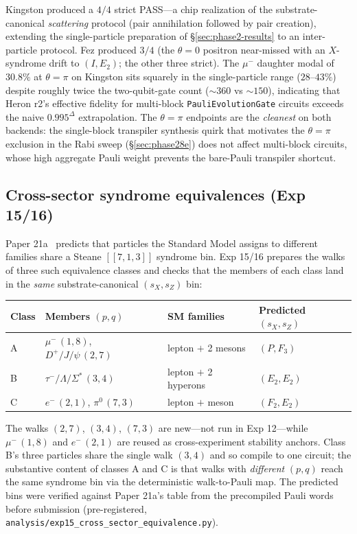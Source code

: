 \documentclass[11pt]{article}
\newcommand{\Klogical}{[[7, 1, 3]]}
\begin{document}
Kingston produced a $4/4$ strict PASS---a chip realization of the substrate-canonical \emph{scattering} protocol (pair annihilation followed by pair creation), extending the single-particle preparation of \S\ref{sec:phase2-results} to an inter-particle protocol.  Fez produced $3/4$ (the $\theta = 0$ positron near-missed with an $X$-syndrome drift to $(I, E_2)$; the other three strict).  The $\mu^-$ daughter modal of $30.8\%$ at $\theta = \pi$ on Kingston sits squarely in the single-particle range ($28$--$43\%$) despite roughly twice the two-qubit-gate count ($\sim 360$ vs $\sim 150$), indicating that Heron r2's effective fidelity for multi-block \texttt{PauliEvolutionGate} circuits exceeds the naive $0.995^{\Delta}$ extrapolation.  The $\theta = \pi$ endpoints are the \emph{cleanest} on both backends: the single-block transpiler synthesis quirk that motivates the $\theta = \pi$ exclusion in the Rabi sweep (\S\ref{sec:phase28e}) does not affect multi-block circuits, whose high aggregate Pauli weight prevents the bare-Pauli transpiler shortcut.

\subsection{Cross-sector syndrome equivalences (Exp 15/16)}
\label{sec:cross-sector-equivalences}

Paper 21a~\cite[\S 7.2]{Paper21a} predicts that particles the Standard Model assigns to different families share a Steane $\Klogical$ syndrome bin.  Exp 15/16 prepares the walks of three such equivalence classes and checks that the members of each class land in the \emph{same} substrate-canonical $(s_X, s_Z)$ bin:
\begin{center}
\begin{tabular}{llll}
\toprule
Class & Members $(p, q)$ & SM families & Predicted $(s_X, s_Z)$ \\
\midrule
A & $\mu^-\,(1,8)$, $D^+\!/J\!/\psi\,(2,7)$ & lepton $+$ 2 mesons & $(P, F_3)$ \\
B & $\tau^-\!/\Lambda/\Sigma^*\,(3,4)$ & lepton $+$ 2 hyperons & $(E_2, E_2)$ \\
C & $e^-\,(2,1)$, $\pi^0\,(7,3)$ & lepton $+$ meson & $(F_2, E_2)$ \\
\bottomrule
\end{tabular}
\end{center}
The walks $(2,7)$, $(3,4)$, $(7,3)$ are new---not run in Exp 12---while $\mu^-\,(1,8)$ and $e^-\,(2,1)$ are reused as cross-experiment stability anchors.  Class B's three particles share the single walk $(3,4)$ and so compile to one circuit; the substantive content of classes A and C is that walks with \emph{different} $(p, q)$ reach the same syndrome bin via the deterministic walk-to-Pauli map.  The predicted bins were verified against Paper 21a's table from the precompiled Pauli words before submission (pre-registered, \texttt{analysis/exp15\_cross\_sector\_equivalence.py}).
\end{document}
